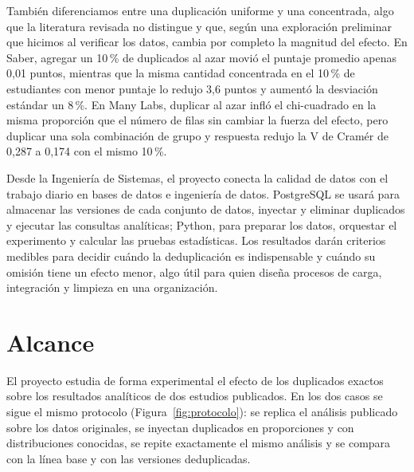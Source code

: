 \documentclass[11pt,openany,oneside,letterpaper]{book}
\begin{document}
También diferenciamos entre una duplicación uniforme y una concentrada, algo que la literatura revisada no distingue y que, según una exploración preliminar que hicimos al verificar los datos, cambia por completo la magnitud del efecto. En Saber, agregar un 10\,\% de duplicados al azar movió el puntaje promedio apenas 0,01 puntos, mientras que la misma cantidad concentrada en el 10\,\% de estudiantes con menor puntaje lo redujo 3,6 puntos y aumentó la desviación estándar un 8\,\%. En Many Labs, duplicar al azar infló el chi-cuadrado en la misma proporción que el número de filas sin cambiar la fuerza del efecto, pero duplicar una sola combinación de grupo y respuesta redujo la V de Cramér de 0,287 a 0,174 con el mismo 10\,\%.

Desde la Ingeniería de Sistemas, el proyecto conecta la calidad de datos con el trabajo diario en bases de datos e ingeniería de datos. PostgreSQL se usará para almacenar las versiones de cada conjunto de datos, inyectar y eliminar duplicados y ejecutar las consultas analíticas; Python, para preparar los datos, orquestar el experimento y calcular las pruebas estadísticas. Los resultados darán criterios medibles para decidir cuándo la deduplicación es indispensable y cuándo su omisión tiene un efecto menor, algo útil para quien diseña procesos de carga, integración y limpieza en una organización.
\chapter{Alcance}

El proyecto estudia de forma experimental el efecto de los duplicados exactos sobre los resultados analíticos de dos estudios publicados. En los dos casos se sigue el mismo protocolo (Figura~\ref{fig:protocolo}): se replica el análisis publicado sobre los datos originales, se inyectan duplicados en proporciones y con distribuciones conocidas, se repite exactamente el mismo análisis y se compara con la línea base y con las versiones deduplicadas.
\end{document}
